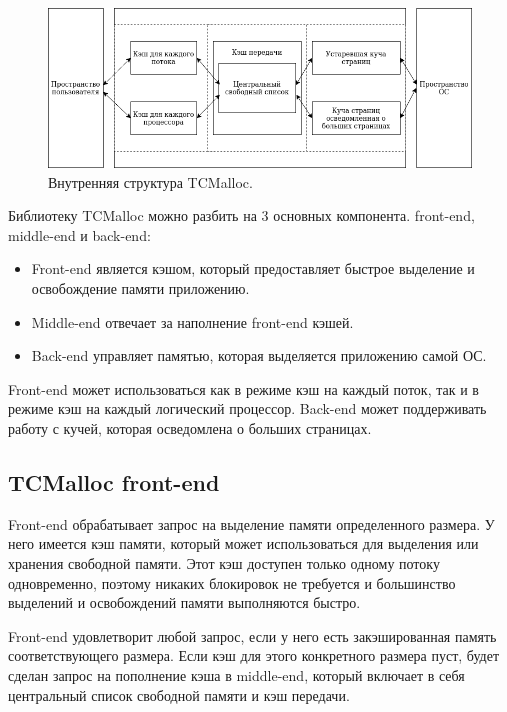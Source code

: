 \begin{figure}[!h]
	\begin{center}
		\includegraphics[scale=0.6]{images/tcmalloc-overview.png}
		\caption{Внутренняя структура TCMalloc.}
		\label{tcmalloc-overview}
	\end{center}
\end{figure}

Библиотеку TCMalloc можно разбить на 3 основных компонента. front-end, middle-end и back-end:
\begin{itemize}
	\item Front-end является кэшом, который предоставляет быстрое выделение и освобождение памяти приложению.
	\item Middle-end отвечает за наполнение front-end кэшей.
	\item Back-end управляет памятью, которая выделяется приложению самой ОС.
\end{itemize}

Front-end может использоваться как в режиме кэш на каждый поток, так и в режиме кэш на каждый логический процессор. Back-end может поддерживать работу с кучей, которая осведомлена о больших страницах.

\subsection{TCMalloc front-end}
Front-end обрабатывает запрос на выделение памяти определенного размера. У него имеется кэш памяти, который может использоваться для выделения или хранения свободной памяти. Этот кэш доступен только одному потоку одновременно, поэтому никаких блокировок не требуется и большинство выделений и освобождений памяти выполняются быстро.

Front-end удовлетворит любой запрос, если у него есть закэшированная память соответствующего размера. Если кэш для этого конкретного размера пуст, будет сделан запрос на пополнение кэша в middle-end, который включает в себя центральный список свободной памяти и кэш передачи.

